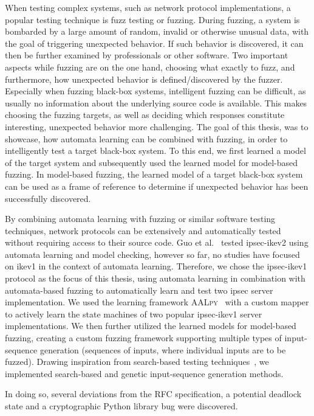 When testing complex systems, such as network protocol implementations, a popular testing technique is fuzz testing or fuzzing. During fuzzing, a system is bombarded by a large amount of random, invalid or otherwise unusual data, with the goal of triggering unexpected behavior. If such behavior is discovered, it can then be further examined by professionals or other software. Two important aspects while fuzzing are on the one hand, choosing what exactly to fuzz, and furthermore, how unexpected behavior is defined/discovered by the fuzzer. Especially when fuzzing black-box systems, intelligent fuzzing can be difficult, as usually no information about the underlying source code is available. This makes choosing the fuzzing targets, as well as deciding which responses constitute interesting, unexpected behavior more challenging. The goal of this thesis, was to showcase, how automata learning can be combined with fuzzing, in order to intelligently test a target black-box system. To this end, we first learned a model of the target system and subsequently used the learned model for model-based fuzzing. In model-based fuzzing, the learned model of a target black-box system can be used as a frame of reference to determine if unexpected behavior has been successfully discovered. 

By combining automata learning with fuzzing or similar software testing techniques, network protocols can be extensively and automatically tested without requiring access to their source code. Guo et al.~\cite{guo2019model} tested \ac{ipsec}-\ac{ike}v2 using automata learning and model checking, however so far, no studies have focused on \ac{ike}v1 in the context of automata learning. Therefore, we chose the \ac{ipsec}-\ac{ike}v1 protocol as the focus of this thesis, using automata learning in combination with automata-based fuzzing to automatically learn and test two \ac{ipsec} server implementation. We used the learning framework \textsc{AALpy}~\cite{software:aalpy} with a custom mapper to actively learn the state machines of two popular \ac{ipsec}-\ac{ike}v1 server implementations. We then further utilized the learned models for model-based fuzzing, creating a custom fuzzing framework supporting multiple types of input-sequence generation (sequences of inputs, where individual inputs are to be fuzzed). Drawing inspiration from search-based testing techniques~\cite{fuzzingbook2023:SearchBasedFuzzer}, we implemented search-based and genetic input-sequence generation methods. 

In doing so, several deviations from the RFC specification, a potential deadlock state and a cryptographic Python library bug were discovered.


